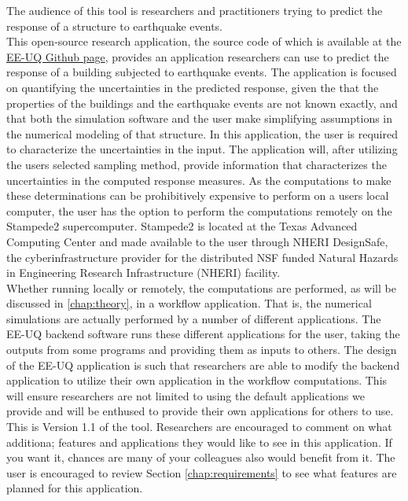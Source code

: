 The audience of this tool is researchers and practitioners trying to
predict the response of a structure to earthquake events.\\

This open-source research application, the source code of which is
available at the \href{https://github.com/NHERI-SimCenter/EE-UQ}{EE-UQ
Github page}, provides an application researchers can use to predict
the response of a building subjected to earthquake events. The
application is focused on quantifying the uncertainties in the
predicted response, given the that the properties of the buildings and
the earthquake events are not known exactly, and that both the
simulation software and the user make simplifying assumptions in the
numerical modeling of that structure. In this application, the user is
required to characterize the uncertainties in the input. The
application will, after utilizing the users selected sampling method,
provide information that characterizes the uncertainties in the
computed response measures. As the computations to make these
determinations can be prohibitively expensive to perform on a users
local computer, the user has the option to perform the computations
remotely on the Stampede2 supercomputer. Stampede2 is located at the
Texas Advanced Computing Center and made available to the user through
NHERI DesignSafe, the cyberinfrastructure provider for the distributed
NSF funded Natural Hazards in Engineering Research Infrastructure
(NHERI) facility.\\

Whether running locally or remotely, the computations are performed,
as will be discussed in \autoref{chap:theory}, in a workflow
application. That is, the numerical simulations are actually performed
by a number of different applications. The EE-UQ backend software runs
these different applications for the user, taking the outputs from
some programs and providing them as inputs to others. The design of
the EE-UQ application is such that researchers are able to modify the
backend application to utilize their own application in the workflow
computations. This will ensure researchers are not limited to using
the default applications we provide and will be enthused to provide
their own applications for others to use. \\

This is Version 1.1 of the tool. Researchers are encouraged to comment
on what additiona; features and applications they would like to see in
this application. If you want it, chances are many of your colleagues
also would benefit from it. The user is encouraged to review
Section \autoref{chap:requirements} to see what features are planned for this
application.
